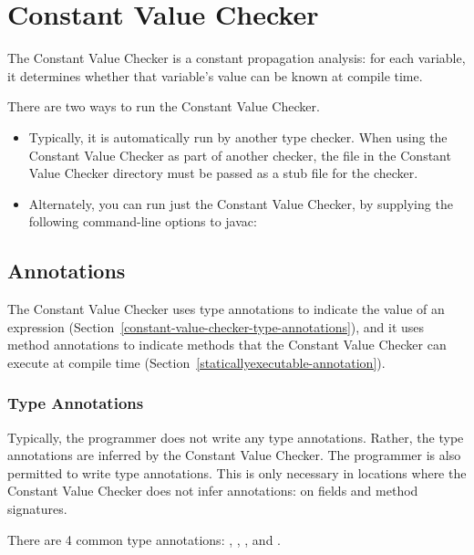 \htmlhr
\chapter{Constant Value Checker\label{constant-value-checker}}

The Constant Value Checker is a constant propagation analysis: for
each variable, it determines whether that variable's value can be
known at compile time.

There are two ways to run the Constant Value Checker.
\begin{itemize}
\item
Typically, it is automatically run by another type checker.
When using the Constant Value Checker as part of another checker, the
 file in the Constant Value Checker directory must
be passed as a stub file for the checker.
\item
Alternately, you can run just the Constant Value Checker, by
supplying the following command-line options to javac:
\end{itemize}

\section{Annotations\label{constant-value-checker-annotations}}

The Constant Value Checker uses type annotations to indicate the value of
an expression (Section~\ref{constant-value-checker-type-annotations}), and
it uses method annotations to indicate methods that the Constant Value
Checker can execute at compile time
(Section~\ref{staticallyexecutable-annotation}).


\subsection{Type Annotations\label{constant-value-checker-type-annotations}}

Typically, the programmer does not write any type annotations.  Rather, the
type annotations are inferred by the Constant Value Checker.
The programmer is also permitted to write type annotations.  This is only necessary in
locations where the Constant Value Checker does not infer annotations:  on fields
and method signatures.

There are 4 common type annotations:
,
,
, and
.

